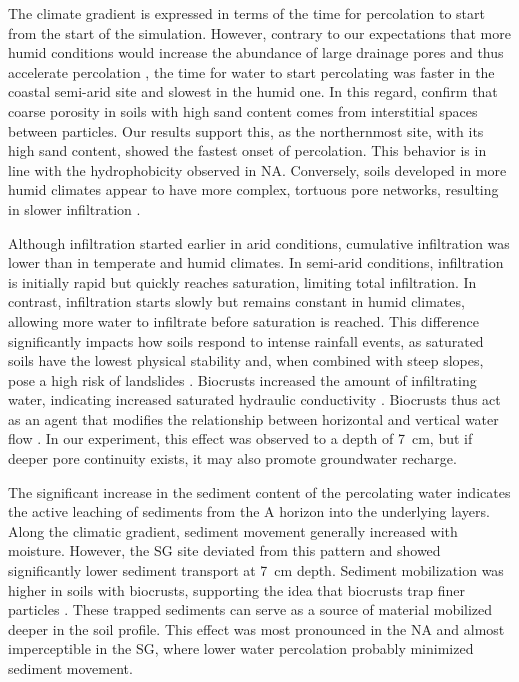 The climate gradient is expressed in terms of the time for percolation to start from the start of the simulation. However, contrary to our expectations that more humid conditions would increase the abundance of large drainage pores and thus accelerate percolation \citep{RiverasMunoz2022}, the time for water to start percolating was faster in the coastal semi-arid site and slowest in the humid one. In this regard, \citet{Nielsen2018} confirm that coarse porosity in soils with high sand content comes from interstitial spaces between particles. Our results support this, as the northernmost site, with its high sand content, showed the fastest onset of percolation. This behavior is in line with the hydrophobicity observed in NA. Conversely, soils developed in more humid climates appear to have more complex, tortuous pore networks, resulting in slower infiltration \citep{Crawford2006}.

Although infiltration started earlier in arid conditions, cumulative infiltration was lower than in temperate and humid climates. In semi-arid conditions, infiltration is initially rapid but quickly reaches saturation, limiting total infiltration. In contrast, infiltration starts slowly but remains constant in humid climates, allowing more water to infiltrate before saturation is reached. This difference significantly impacts how soils respond to intense rainfall events, as saturated soils have the lowest physical stability \citep{Montrasio2018} and, when combined with steep slopes, pose a high risk of landslides \citep{Godt2009}.
Biocrusts increased the amount of infiltrating water, indicating increased saturated hydraulic conductivity \citep{Bauer1974}. Biocrusts thus act as an agent that modifies the relationship between horizontal and vertical water flow \citep{Li2022}. In our experiment, this effect was observed to a depth of \SI{7}{\centi\meter}, but if deeper pore continuity exists, it may also promote groundwater recharge.

The significant increase in the sediment content of the percolating water indicates the active leaching of sediments from the A horizon into the underlying layers. Along the climatic gradient, sediment movement generally increased with moisture. However, the SG site deviated from this pattern and showed significantly lower sediment transport at \SI{7}{\centi\meter} depth. Sediment mobilization was higher in soils with biocrusts, supporting the idea that biocrusts trap finer particles \citep{Chen2008,GarciaPichel2016}. These trapped sediments can serve as a source of material mobilized deeper in the soil profile. This effect was most pronounced in the NA and almost imperceptible in the SG, where lower water percolation probably minimized sediment movement.

